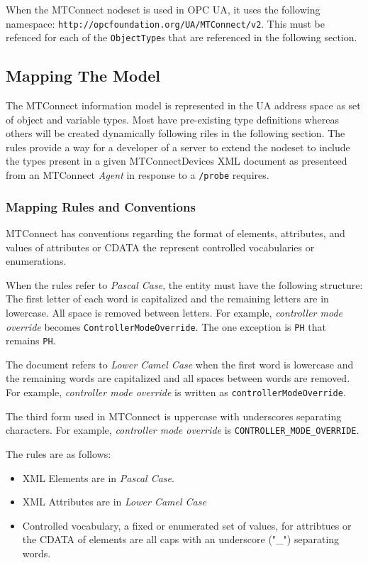 When the MTConnect nodeset is used in OPC UA, it uses the following namespace: \texttt{http://opcfoundation.org/UA/MTConnect/v2}. This must be refenced for each of the \texttt{ObjectType}s that are referenced in the following section.

\subsection{Mapping The Model}
\lstset{language=XML,numbers=left,xleftmargin=2em}

The MTConnect information model is represented in the UA address space as set of object and variable types. Most have pre-existing type definitions whereas others will be created dynamically following riles in the following section. The rules provide a way for a developer of a server to extend the nodeset to include the types present in a given MTConnectDevices XML document as presenteed from an MTConnect \textit{Agent} in response to a \texttt{/probe} requires.

\subsubsection{Mapping Rules and Conventions}

MTConnect has conventions regarding the format of elements, attributes, and values of attributes or CDATA the represent controlled vocabularies or enumerations. 

When the rules refer to \textit{Pascal Case}, the entity must have the following structure: The first letter of each word is capitalized and the remaining letters are in lowercase. All space is removed between letters. For example, \textit{controller mode override} becomes \texttt{Controller\-Mode\-Override}. The one exception is \texttt{PH} that remains \texttt{PH}.

The document refers to \textit{Lower Camel Case} when the first word is lowercase and the remaining words are capitalized and all spaces between words are removed. For example, \textit{controller mode override} is written as \texttt{controllerModeOverride}.

The third form used in MTConnect is uppercase with underscores separating characters. For example, \textit{controller mode override} is \texttt{CONTROLLER_MODE_OVERRIDE}.

The rules are as follows:
\begin{itemize}
\item XML Elements are in \textit{Pascal Case}.
\item XML Attributes are in \textit{Lower Camel Case}
\item Controlled vocabulary, a fixed or enumerated set of values, for attribtues or the CDATA of elements are all caps with an underscore ("\_") separating words. 
\end{itemize}

